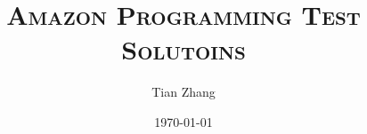 \documentclass[letterpaper]{article}
\begin{document}
\title{\textsc{Amazon Programming Test Solutoins}}
\author{Tian Zhang}
\date{\today}
\maketitle


\end{document}
